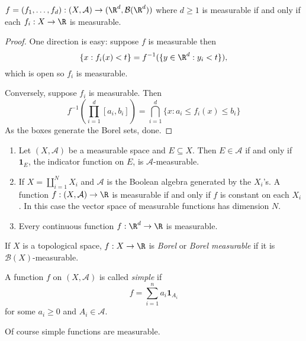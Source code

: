 \documentclass[a4paper]{article}
\begin{document}
\begin{proposition}
  \(f = (f_1, \dots, f_d): (X, \mathcal A) \to (\R^d, \mathcal B(\R^d))\) where \(d \geq 1\) is measurable if and only if each \(f_i: X \to \R\) is measurable.
\end{proposition}

\begin{proof}
  One direction is easy: suppose \(f\) is measurable then
  \[
    \{x: f_i(x) < t\} = f^{-1}(\{y \in \R^d: y_i < t\}),
  \]
  which is open so \(f_i\) is measurable.

  Conversely, suppose \(f_i\) is measurable. Then
  \[
    f^{-1}( \prod_{i = 1}^d [a_i, b_i] )
    = \bigcap_{i = 1}^d \{x: a_i \leq f_i(x) \leq b_i\}
  \]
  As the boxes generate the Borel sets, done.
\end{proof}

\begin{eg}\leavevmode
  \begin{enumerate}
  \item Let \((X, \mathcal A)\) be a measurable space and \(E \subseteq X\). Then \(E \in \mathcal A\) if and only if \(\mathbf 1_E\), the indicator function on \(E\), is \(\mathcal A\)-measurable.
  \item If \(X = \coprod_{i = 1}^N X_i\) and \(\mathcal A\) is the Boolean algebra generated by the \(X_i\)'s. A function \(f: (X, \mathcal A) \to \R\) is measurable if and only if \(f\) is constant on each \(X_i\). In this case the vector space of measurable functions has dimension \(N\).
  \item Every continuous function \(f: \R^d \to \R\) is measurable.
  \end{enumerate}
\end{eg}

\begin{definition}
  If \(X\) is a topological space, \(f: X \to \R\) is \emph{Borel} or \emph{Borel measurable} if it is \(\mathcal B(X)\)-measurable.
\end{definition}

\begin{definition}
  A function \(f\) on \((X, \mathcal A)\) is called \emph{simple} if
  \[
    f = \sum_{i = 1}^n a_i \mathbf 1_{A_i}
  \]
  for some \(a_i \geq 0\) and \(A_i \in \mathcal A\).
\end{definition}

Of course simple functions are measurable.
\end{document}
